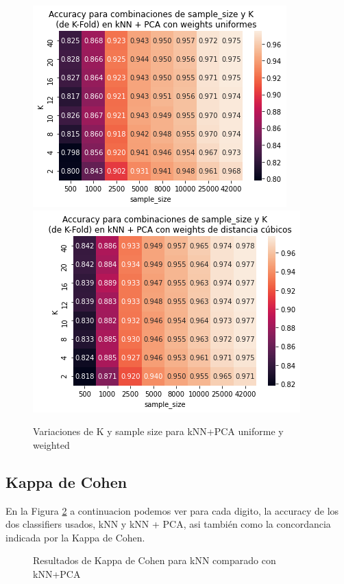 \documentclass[a4paper]{article}
\begin{document}
    \begin{figure}[H]
            \centering
            \includegraphics[scale=0.5]{img/exp/pca/vars_knn_pca_unif.png}
            \includegraphics[scale=0.5]{img/exp/pca/vars_knn_pca_weight.png}
            \caption{Variaciones de K y sample size para kNN+PCA uniforme y weighted}
            \label{fig:vars-knn-pca}
    \end{figure}

    \subsection{Kappa de Cohen}
    En la Figura \ref{tab:kappa} a continuacion podemos ver para cada digito, la accuracy de los dos classifiers usados, kNN y kNN + PCA, asi también como la concordancia indicada por la Kappa de Cohen.
    
    \begin{figure}[H]
    \centering
    \caption{Resultados de Kappa de Cohen para kNN comparado con kNN+PCA}
    \label{tab:kappa}
    \end{figure}
\end{document}

